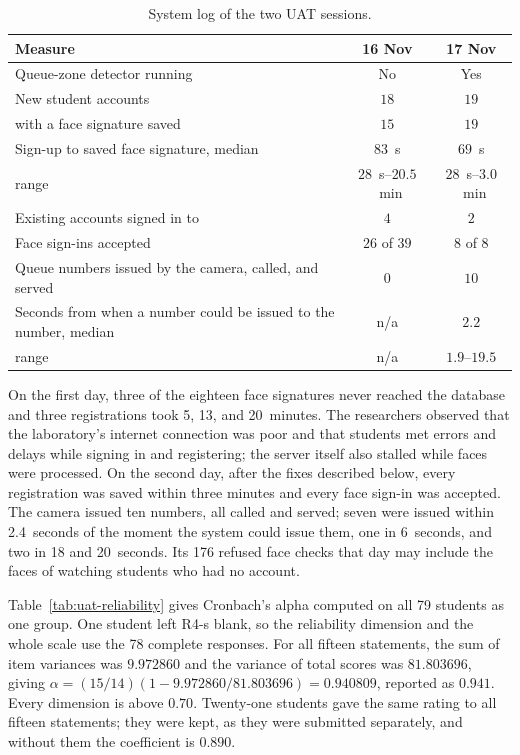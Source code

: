 \documentclass{research}
\begin{document}
\begin{table}[H]
\centering
\caption{System log of the two UAT sessions.}
\label{tab:uat-log}
\begin{tabular}{p{}cc}
\hline
Measure & 16 Nov & 17 Nov \\
\hline
Queue-zone detector running & No & Yes \\
New student accounts & $18$ & $19$ \\
\quad with a face signature saved & $15$ & $19$ \\
Sign-up to saved face signature, median & $83$~s & $69$~s \\
\quad range & $28$~s--$20.5$~min & $28$~s--$3.0$~min \\
Existing accounts signed in to & $4$ & $2$ \\
Face sign-ins accepted & $26$ of $39$ & $8$ of $8$ \\
Queue numbers issued by the camera, called, and served & $0$ & $10$ \\
Seconds from when a number could be issued to the number, median
  & n/a & $2.2$ \\
\quad range & n/a & $1.9$--$19.5$ \\
\hline
\end{tabular}
\end{table}

On the first day, three of the eighteen face signatures never reached the
database and three registrations took 5, 13, and 20~minutes. The
researchers observed that the laboratory's internet connection was poor
and that students met errors and delays while signing in and registering;
the server itself also stalled while faces were processed. On the
second day, after the fixes described below, every registration was
saved within three minutes and every face sign-in was accepted. The
camera issued ten numbers, all called and served; seven were issued
within 2.4~seconds of the moment the system could issue them, one in
6~seconds, and two in 18 and 20~seconds. Its 176 refused face checks
that day may include the faces of watching students who had no account.

\label{subsec:uat-reliability}

Table~\ref{tab:uat-reliability} gives Cronbach's alpha computed on all
79 students as one group. One student left R4-s blank, so the
reliability dimension and the whole scale use the 78 complete responses.
For all fifteen statements, the sum of item variances was $9.972860$ and
the variance of total scores was $81.803696$, giving
$\alpha=(15/14)(1-9.972860/81.803696)=0.940809$, reported as $0.941$.
Every dimension is above $0.70$. Twenty-one students gave the same rating
to all fifteen statements; they were kept, as they were submitted
separately, and without them the coefficient is $0.890$.
\end{document}
